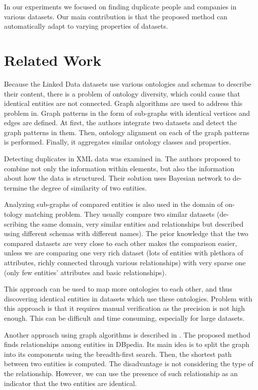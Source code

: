 \documentclass{llncs}
\begin{document}
In our experiments we focused on finding duplicate people and companies
in various datasets. Our main contribution is that the proposed method can
automatically adapt to varying properties of datasets.

\section{Related Work}

Because the Linked Data datasets use various ontologies and schemas to describe
their content, there is a problem of ontology diversity, which could cause that
identical entities are not connected. Graph algorithms are used to address this
problem in\cite{20}. Graph patterns in the form of sub-graphs with identical vertices
and edges are defined. At first, the authors integrate two datasets and detect the
graph patterns in them. Then, ontology alignment on each of the graph patterns
is performed. Finally, it aggregates similar ontology classes and properties.

Detecting duplicates in XML data was examined in\cite{9}. The authors proposed
to combine not only the information within elements, but also the information
about how the data is structured. Their solution uses Bayesian network to de-
termine the degree of similarity of two entities.

Analyzing sub-graphs of compared entities is also used in the domain of on-
tology matching problem\cite{3,15}. They usually compare two similar datasets (de-
scribing the same domain, very similar entities and relationships but described
using different schemas with different names). The prior knowledge that the two
compared datasets are very close to each other makes the comparison easier,
unless we are comparing one very rich dataset (lots of entities with plethora of
attributes, richly connected through various relationships) with very sparse one
(only few entities' attributes and basic relationships).

This approach can be used to map more ontologies to each other, and thus
discovering identical entities in datasets which use these ontologies. Problem with
this approach is that it requires manual verification as the precision is not high
enough. This can be difficult and time consuming, especially for large datasets.

Another approach using graph algorithms is described in \cite{8}. The proposed
method finds relationships among entities in DBpedia. Its main idea is to split
the graph into its components using the breadth-first search. Then, the shortest
path between two entities is computed. The disadvantage is not considering the
type of the relationship. However, we can use the presence of such relationship
as an indicator that the two entities are identical.
\end{document}
